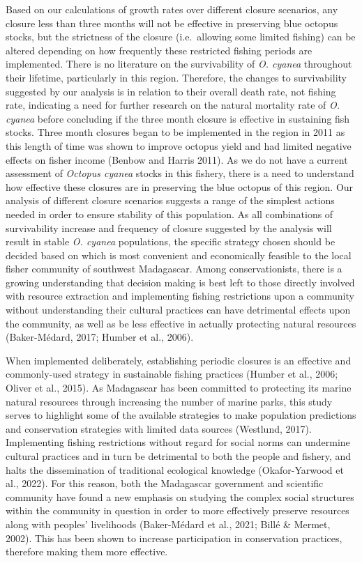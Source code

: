 \documentclass[
]{article}
\begin{document}
Based on our calculations of growth rates over different closure scenarios, any closure less than three months will not be effective in preserving blue octopus stocks, but the strictness of the closure (i.e.~allowing some limited fishing) can be altered depending on how frequently these restricted fishing periods are implemented. There is no literature on the survivability of \emph{O. cyanea} throughout their lifetime, particularly in this region. Therefore, the changes to survivability suggested by our analysis is in relation to their overall death rate, not fishing rate, indicating a need for further research on the natural mortality rate of \emph{O. cyanea} before concluding if the three month closure is effective in sustaining fish stocks. Three month closures began to be implemented in the region in 2011 as this length of time was shown to improve octopus yield and had limited negative effects on fisher income (Benbow and Harris 2011). As we do not have a current assessment of \emph{Octopus cyanea} stocks in this fishery, there is a need to understand how effective these closures are in preserving the blue octopus of this region. Our analysis of different closure scenarios suggests a range of the simplest actions needed in order to ensure stability of this population. As all combinations of survivability increase and frequency of closure suggested by the analysis will result in stable \emph{O. cyanea} populations, the specific strategy chosen should be decided based on which is most convenient and economically feasible to the local fisher community of southwest Madagascar. Among conservationists, there is a growing understanding that decision making is best left to those directly involved with resource extraction and implementing fishing restrictions upon a community without understanding their cultural practices can have detrimental effects upon the community, as well as be less effective in actually protecting natural resources (Baker-Médard, 2017; Humber et al., 2006).

When implemented deliberately, establishing periodic closures is an effective and commonly-used strategy in sustainable fishing practices (Humber et al., 2006; Oliver et al., 2015). As Madagascar has been committed to protecting its marine natural resources through increasing the number of marine parks, this study serves to highlight some of the available strategies to make population predictions and conservation strategies with limited data sources (Westlund, 2017). Implementing fishing restrictions without regard for social norms can undermine cultural practices and in turn be detrimental to both the people and fishery, and halts the dissemination of traditional ecological knowledge (Okafor-Yarwood et al., 2022). For this reason, both the Madagascar government and scientific community have found a new emphasis on studying the complex social structures within the community in question in order to more effectively preserve resources along with peoples' livelihoods (Baker-Médard et al., 2021; Billé \& Mermet, 2002). This has been shown to increase participation in conservation practices, therefore making them more effective.
\end{document}
